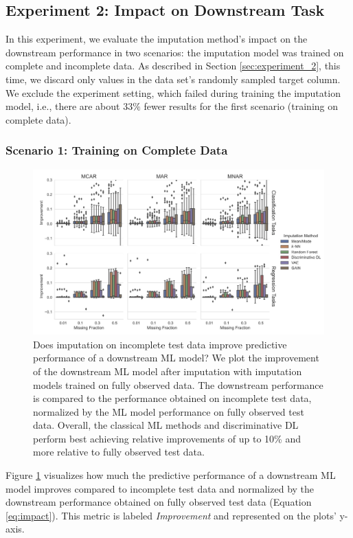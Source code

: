 \documentclass[utf8]{frontiersSCNS} %
\begin{document}
\subsection{Experiment 2: Impact on Downstream Task}

In this experiment, we evaluate the imputation method's impact on the downstream performance in two scenarios: the imputation model was trained on complete and incomplete data. As described in Section \ref{sec:experiment_2}, this time, we discard only values in the data set's randomly sampled target column. We exclude the experiment setting, which failed during training the imputation model, i.e., there are about $33\%$ fewer results for the first scenario (training on complete data).


\subsubsection{Scenario 1: Training on Complete Data}

\begin{figure}\centering
	\includegraphics[width=1\columnwidth]{fully_observed_downstream_boxplot}
	\caption{Does imputation on incomplete test data improve predictive performance of a downstream ML model? We plot the improvement of the downstream ML model after imputation with imputation models trained on fully observed data. The downstream performance is compared to the performance obtained on incomplete test data, normalized by the ML model performance on fully observed test data. Overall, the classical ML methods and discriminative DL perform best achieving relative improvements of up to 10\% and more relative to fully observed test data.
	}
	\label{fig:fully_observed_downstream_boxplot}
\end{figure}

Figure \ref{fig:fully_observed_downstream_boxplot} visualizes how much the predictive performance of a downstream ML model improves compared to incomplete test data and normalized by the downstream performance obtained on fully observed test data (Equation \ref{eq:impact}). This metric is labeled \textit{Improvement} and represented on the plots' y-axis.
\end{document}
